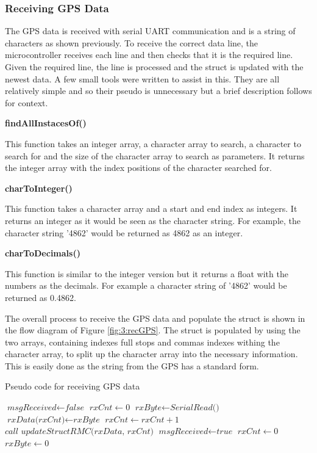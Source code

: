 \subsubsection{Receiving GPS Data}
The GPS data is received with serial UART communication and is a string of characters as shown previously. To receive the correct data line, the microcontroller receives each line and then checks that it is the required line. Given the required line, the line is processed and the struct is updated with the newest data. A few small tools were written to assist in this. They are all relatively simple and so their pseudo is unnecessary but a brief description follows for context.\par
\textbf{findAllInstacesOf()}\par
This function takes an integer array, a character array to search, a character to search for and the size of the character array to search as parameters. It returns the integer array with the index positions of the character searched for.\par
\textbf{charToInteger()}\par
This function takes a character array and a start and end index as integers. It returns an integer as it would be seen as the character string. For example, the character string '4862' would be returned as 4862 as an integer.\par
\textbf{charToDecimals()}\par
This function is similar to the integer version but it returns a float with the numbers as the decimals. For example a character string of '4862' would be returned as 0.4862.\par
The overall process to receive the GPS data and populate the struct is shown in the flow diagram of Figure \ref{fig:3:recGPS}. The struct is populated by using the two arrays, containing indexes full stops and commas indexes withing the character array, to split up the character array into the necessary information. This is easily done as the string from the GPS has a standard form.
\begin{algorithm}
	\caption{Pseudo code for receiving GPS data}
	\label{alg:3:receiveGPS}
	\begin{algorithmic}[1]
		\State $\textit{msgReceived} \gets \textit{false}$
		\State $\textit{rxCnt} \gets 0$
		\State $\textit{rxByte} \gets \textit{SerialRead()}$
		\State $\textit{rxData(rxCnt)} \gets \textit{rxByte}$
		\State $\textit{rxCnt} \gets \textit{rxCnt} + 1$ 
		\EndIf
		\EndWhile
		\State $\textit{call updateStructRMC(rxData, rxCnt)}$
		\State $\textit{msgReceived} \gets \textit{true}$
		\EndIf
		\State $\textit{rxCnt} \gets 0$
		\State $\textit{rxByte} \gets 0$
		\EndWhile
	\end{algorithmic}
\end{algorithm}
